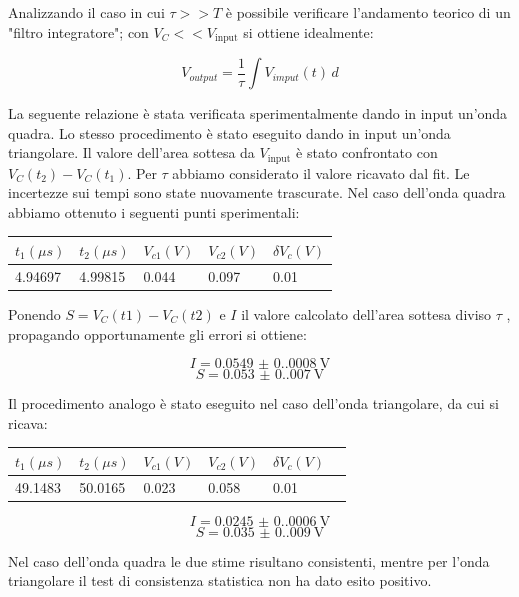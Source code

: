 \documentclass[12pt, a4paper]{article}
\begin{document}
Analizzando il caso in cui \(\tau >> T\) è possibile verificare l'andamento teorico di un "filtro integratore";
con \(V_C<< V_\text{input}\) si ottiene idealmente:

\[V_{output}=\frac{1}{\tau} \int V_{imput}(t) \, d \]

La seguente relazione è stata verificata sperimentalmente dando in input un'onda quadra.
Lo stesso procedimento è stato eseguito dando in input un'onda triangolare. 
Il valore dell'area sottesa da \(V_\text{input}\) è stato confrontato con \(V_C(t_2)-V_C(t_1)\). Per \(\tau\)
abbiamo considerato il valore ricavato dal fit. Le incertezze sui tempi sono state nuovamente trascurate.
Nel caso dell'onda quadra abbiamo ottenuto i seguenti punti sperimentali:

\begin{table}[H]
\centering
\begin{tabular}{@{}lllll@{}}
\toprule
\(t_1(\mu s)\)    & \(t_2(\mu s)\) & \(V_{c1}(V)\) & \(V_{c2}(V)\) & \(\delta V_c(V)\) \\ \midrule
4.94697 & 4.99815  & 0.044  & 0.097  & 0.01        \\ \bottomrule
\end{tabular}
\end{table}

Ponendo \(S = V_C(t1) - V_C(t2)\) e \(I\) il valore calcolato dell'area sottesa diviso \(\tau\) , propagando opportunamente gli errori 
si ottiene:

\[I = \qty{0.0549(0.0008)}{\volt}\] 
\[S= \qty{0.053(0.007)}{\volt}\] 

Il procedimento analogo è stato eseguito nel caso dell'onda triangolare, da cui si ricava:

\begin{table}[H]
\centering
\begin{tabular}{@{}llllll@{}}
\toprule
\(t_1(\mu s)\) & \(t_2(\mu s)\) & \(V_{c1}(V)\) & \(V_{c2}(V)\) & \(\delta V_c(V)\) \\ \midrule
49.1483  & 50.0165  & 0.023  & 0.058  & 0.01   \\ \bottomrule
\end{tabular}
\end{table}

\[I = \qty{0.0245(0.0006)}{\volt}\] 
\[S= \qty{0.035(0.009)}{\volt}\] 

Nel caso dell'onda quadra le due stime risultano consistenti, mentre per l'onda triangolare 
il test di consistenza statistica non ha dato esito positivo.   
\end{document}
